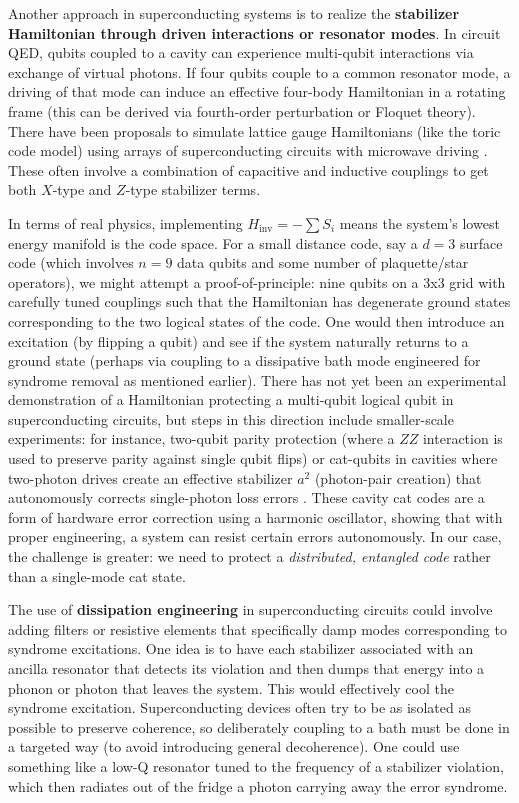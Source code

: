 \documentclass[11pt]{article}
\begin{document}
Another approach in superconducting systems is to realize the \textbf{stabilizer Hamiltonian through driven interactions or resonator modes}. In circuit QED, qubits coupled to a cavity can experience multi-qubit interactions via exchange of virtual photons. If four qubits couple to a common resonator mode, a driving of that mode can induce an effective four-body Hamiltonian in a rotating frame (this can be derived via fourth-order perturbation or Floquet theory). There have been proposals to simulate lattice gauge Hamiltonians (like the toric code model) using arrays of superconducting circuits with microwave driving \cite{Kapit2016}. These often involve a combination of capacitive and inductive couplings to get both $X$-type and $Z$-type stabilizer terms.

In terms of real physics, implementing $H_{\mathrm{inv}} = -\sum S_i$ means the system's lowest energy manifold is the code space. For a small distance code, say a $d=3$ surface code (which involves $n = 9$ data qubits and some number of plaquette/star operators), we might attempt a proof-of-principle: nine qubits on a 3x3 grid with carefully tuned couplings such that the Hamiltonian has degenerate ground states corresponding to the two logical states of the code. One would then introduce an excitation (by flipping a qubit) and see if the system naturally returns to a ground state (perhaps via coupling to a dissipative bath mode engineered for syndrome removal as mentioned earlier). There has not yet been an experimental demonstration of a Hamiltonian protecting a multi-qubit logical qubit in superconducting circuits, but steps in this direction include smaller-scale experiments: for instance, two-qubit parity protection (where a $ZZ$ interaction is used to preserve parity against single qubit flips) or cat-qubits in cavities where two-photon drives create an effective stabilizer $a^2$ (photon-pair creation) that autonomously corrects single-photon loss errors \cite{Lescanne2020}. These cavity cat codes are a form of hardware error correction using a harmonic oscillator, showing that with proper engineering, a system can resist certain errors autonomously. In our case, the challenge is greater: we need to protect a \emph{distributed, entangled code} rather than a single-mode cat state.

The use of \textbf{dissipation engineering} in superconducting circuits could involve adding filters or resistive elements that specifically damp modes corresponding to syndrome excitations. One idea is to have each stabilizer associated with an ancilla resonator that detects its violation and then dumps that energy into a phonon or photon that leaves the system. This would effectively cool the syndrome excitation. Superconducting devices often try to be as isolated as possible to preserve coherence, so deliberately coupling to a bath must be done in a targeted way (to avoid introducing general decoherence). One could use something like a low-Q resonator tuned to the frequency of a stabilizer violation, which then radiates out of the fridge a photon carrying away the error syndrome.
\end{document}
